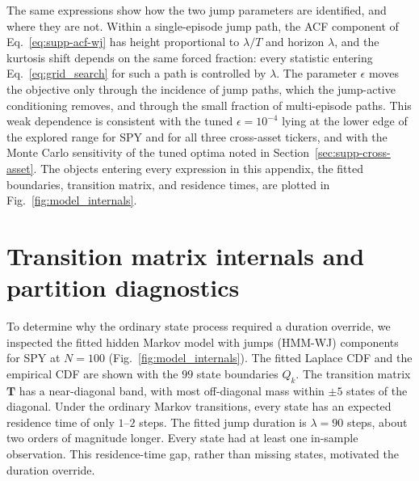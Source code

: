 The same expressions show how the two jump parameters are identified,
and where they are not. Within a single-episode jump path, the ACF
component of Eq.~\eqref{eq:supp-acf-wj} has height proportional to
$\lambda / T$ and horizon $\lambda$, and the kurtosis shift depends
on the same forced fraction: every statistic entering
Eq.~\eqref{eq:grid_search} for such a path is controlled by
$\lambda$. The parameter $\epsilon$ moves the objective only through
the incidence of jump paths, which the jump-active conditioning
removes, and through the small fraction of multi-episode paths. This
weak dependence is consistent with the tuned $\epsilon = 10^{-4}$
lying at the lower edge of the explored range for SPY and for all
three cross-asset tickers, and with the Monte Carlo sensitivity of
the tuned optima noted in
Section~\ref{sec:supp-cross-asset}. The objects entering every
expression in this appendix, the fitted boundaries, transition
matrix, and residence times, are plotted in
Fig.~\ref{fig:model_internals}.


\section{Transition matrix internals and partition diagnostics}
\label{sec:supp-transitions}

To determine why the ordinary state process required a duration
override, we inspected the fitted hidden Markov model with jumps
(HMM-WJ) components for SPY at
$N=100$ (Fig.~\ref{fig:model_internals}). The fitted Laplace CDF and the
empirical CDF are shown with the $99$ state boundaries $Q_k$. The transition matrix
$\mathbf{T}$ has a near-diagonal band, with most off-diagonal mass
within $\pm5$ states of the diagonal. Under the ordinary Markov
transitions, every state has an expected residence time of only
$1$--$2$ steps. The fitted jump duration is $\lambda=90$ steps, about two
orders of magnitude longer. Every state had at least one in-sample
observation. This residence-time gap, rather than missing states,
motivated the duration override.

